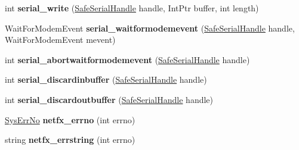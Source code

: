 \begin{DoxyCompactItemize}
int {\bfseries serial\+\_\+write} (\mbox{\hyperlink{class_r_j_c_p_1_1_i_o_1_1_ports_1_1_native_1_1_unix_1_1_safe_serial_handle}{Safe\+Serial\+Handle}} handle, Int\+Ptr buffer, int length)
\item 
\mbox{\label{class_r_j_c_p_1_1_i_o_1_1_ports_1_1_native_1_1_unix_1_1_serial_unix_a3ac457b8b440b0daec1767fd6f2e4cba}} 
Wait\+For\+Modem\+Event {\bfseries serial\+\_\+waitformodemevent} (\mbox{\hyperlink{class_r_j_c_p_1_1_i_o_1_1_ports_1_1_native_1_1_unix_1_1_safe_serial_handle}{Safe\+Serial\+Handle}} handle, Wait\+For\+Modem\+Event mevent)
\item 
\mbox{\label{class_r_j_c_p_1_1_i_o_1_1_ports_1_1_native_1_1_unix_1_1_serial_unix_a7695aa45b2ce9ddc18e5d34df81b9be6}} 
int {\bfseries serial\+\_\+abortwaitformodemevent} (\mbox{\hyperlink{class_r_j_c_p_1_1_i_o_1_1_ports_1_1_native_1_1_unix_1_1_safe_serial_handle}{Safe\+Serial\+Handle}} handle)
\item 
\mbox{\label{class_r_j_c_p_1_1_i_o_1_1_ports_1_1_native_1_1_unix_1_1_serial_unix_a0668eb24c21ac89633f62ecbf2bc0fa9}} 
int {\bfseries serial\+\_\+discardinbuffer} (\mbox{\hyperlink{class_r_j_c_p_1_1_i_o_1_1_ports_1_1_native_1_1_unix_1_1_safe_serial_handle}{Safe\+Serial\+Handle}} handle)
\item 
\mbox{\label{class_r_j_c_p_1_1_i_o_1_1_ports_1_1_native_1_1_unix_1_1_serial_unix_a1a7d312c7fdadd8a6d2c67341fed3dc6}} 
int {\bfseries serial\+\_\+discardoutbuffer} (\mbox{\hyperlink{class_r_j_c_p_1_1_i_o_1_1_ports_1_1_native_1_1_unix_1_1_safe_serial_handle}{Safe\+Serial\+Handle}} handle)
\item 
\mbox{\label{class_r_j_c_p_1_1_i_o_1_1_ports_1_1_native_1_1_unix_1_1_serial_unix_ab5003f7356f4243798ec3eb6eea104c4}} 
\mbox{\hyperlink{namespace_r_j_c_p_1_1_i_o_1_1_ports_1_1_native_1_1_unix_a2572bff8d7f2e644fdffa38ae8565872}{Sys\+Err\+No}} {\bfseries netfx\+\_\+errno} (int errno)
\item 
\mbox{\label{class_r_j_c_p_1_1_i_o_1_1_ports_1_1_native_1_1_unix_1_1_serial_unix_ad6ef561dfd9fed3c061345a27c375e6b}} 
string {\bfseries netfx\+\_\+errstring} (int errno)
\end{DoxyCompactItemize}
